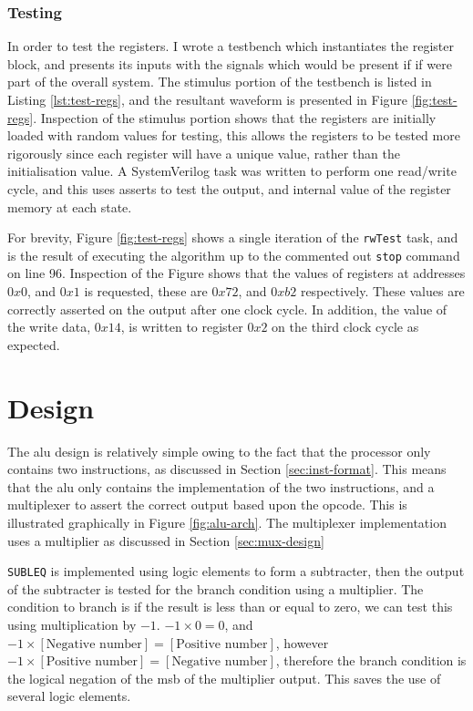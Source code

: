 \subsubsection{Testing}
In order to test the registers. I wrote a testbench which instantiates the register block, and presents its inputs with the signals which would be present if if were part of the overall system. The stimulus portion of the testbench is listed in Listing \ref{lst:test-regs}, and the resultant waveform is presented in Figure \ref{fig:test-regs}. Inspection of the stimulus portion shows that the registers are initially loaded with random values for testing, this allows the registers to be tested more rigorously since each register will have a unique value, rather than the initialisation value. A SystemVerilog task was written to perform one read/write cycle, and this uses asserts to test the output, and internal value of the register memory at each state.

For brevity, Figure \ref{fig:test-regs} shows a single iteration of the \texttt{rwTest} task, and is the result of executing the algorithm up to the commented out \texttt{stop} command on line 96. Inspection of the Figure shows that the values of registers at addresses $0x0$, and $0x1$ is requested, these are $0x72$, and $0xb2$ respectively. These values are correctly asserted on the output after one clock cycle. In addition, the value of the write data, $0x14$, is written to register $0x2$ on the third clock cycle as expected.

\section{ Design} \label{sec:alu-design}

The \gls{alu} design is relatively simple owing to the fact that the processor only contains two instructions, as discussed in Section \ref{sec:inst-format}. This means that the \gls{alu} only contains the implementation of the two instructions, and a multiplexer to assert the correct output based upon the opcode. This is illustrated graphically in Figure \ref{fig:alu-arch}. The multiplexer implementation uses a multiplier as discussed in Section \ref{sec:mux-design}

\texttt{SUBLEQ} is implemented using logic elements to form a subtracter, then the output of the subtracter is tested for the branch condition using a multiplier. The condition to branch is if the result is less than or equal to zero, we can test this using multiplication by $-1$. $-1 \times 0 = 0$, and $-1 \times [\text{Negative number}] = [\text{Positive number}]$, however $-1 \times [\text{Positive number}] = [\text{Negative number}]$, therefore the branch condition is the logical negation of the \gls{msb} of the multiplier output. This saves the use of several logic elements.

